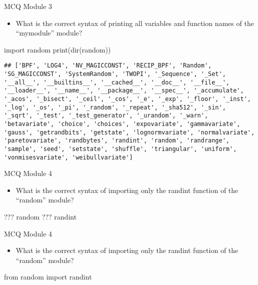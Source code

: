 \documentclass[
  8pt,
  ignorenonframetext,
]{beamer}
\newenvironment{Shaded}{\begin{snugshade}}{\end{snugshade}}
\newcommand{\BuiltInTok}[1]{#1}
\newcommand{\ImportTok}[1]{#1}
\newcommand{\NormalTok}[1]{#1}
\providecommand{\tightlist}{%
  \setlength{\itemsep}{0pt}\setlength{\parskip}{0pt}}
\begin{document}
\begin{frame}[fragile]{MCQ Module 3}
\protect\hypertarget{mcq-module-3-1}{}
\begin{itemize}
\tightlist
\item
  What is the correct syntax of printing all variables and function
  names of the ``mymodule'' module?
\end{itemize}

\begin{Shaded}
\begin{Highlighting}[]
\ImportTok{import}\NormalTok{ random}
\BuiltInTok{print}\NormalTok{(}\BuiltInTok{dir}\NormalTok{(random))}
\end{Highlighting}
\end{Shaded}

\begin{verbatim}
## ['BPF', 'LOG4', 'NV_MAGICCONST', 'RECIP_BPF', 'Random', 'SG_MAGICCONST', 'SystemRandom', 'TWOPI', '_Sequence', '_Set', '__all__', '__builtins__', '__cached__', '__doc__', '__file__', '__loader__', '__name__', '__package__', '__spec__', '_accumulate', '_acos', '_bisect', '_ceil', '_cos', '_e', '_exp', '_floor', '_inst', '_log', '_os', '_pi', '_random', '_repeat', '_sha512', '_sin', '_sqrt', '_test', '_test_generator', '_urandom', '_warn', 'betavariate', 'choice', 'choices', 'expovariate', 'gammavariate', 'gauss', 'getrandbits', 'getstate', 'lognormvariate', 'normalvariate', 'paretovariate', 'randbytes', 'randint', 'random', 'randrange', 'sample', 'seed', 'setstate', 'shuffle', 'triangular', 'uniform', 'vonmisesvariate', 'weibullvariate']
\end{verbatim}
\end{frame}

\begin{frame}[fragile]{MCQ Module 4}
\protect\hypertarget{mcq-module-4}{}
\begin{itemize}
\tightlist
\item
  What is the correct syntax of importing only the randint function of
  the ``random'' module?
\end{itemize}

\begin{Shaded}
\begin{Highlighting}[]
\NormalTok{??? random ??? randint}
\end{Highlighting}
\end{Shaded}
\end{frame}

\begin{frame}[fragile]{MCQ Module 4}
\protect\hypertarget{mcq-module-4-1}{}
\begin{itemize}
\tightlist
\item
  What is the correct syntax of importing only the randint function of
  the ``random'' module?
\end{itemize}

\begin{Shaded}
\begin{Highlighting}[]
\ImportTok{from}\NormalTok{ random }\ImportTok{import}\NormalTok{ randint}
\end{Highlighting}
\end{Shaded}
\end{frame}
\end{document}
